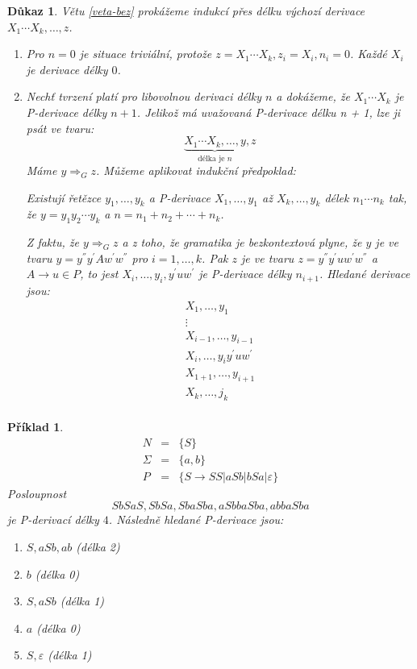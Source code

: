 \documentclass[10pt, a4paper, titlepage]{article}
\theoremstyle{note}
\newtheorem{dukaz}{Důkaz}
\newtheorem{priklad}{Příklad}
\begin{document}
\begin{dukaz}
Větu \ref{veta-bez} prokážeme indukcí přes délku výchozí derivace $X_{1} \cdots X_{k}, \ldots, z$.
\begin{enumerate}
\item
Pro $n = 0$ je situace triviální, protože $z = X_{1} \cdots X_{k}, z_{i} = X_{i}, n_{i} = 0$. Každé $X_{i}$ je derivace délky $0$.

\item
Nechť tvrzení platí pro libovolnou derivaci délky $n$ a dokážeme, že $X_{1} \cdots X_{k}$ je P-derivace délky $n + 1$.
Jelikož má uvažovaná P-derivace délku n + 1, lze ji psát ve tvaru:
$$
\underbrace {X_{1} \cdots X_{k}, \ldots, y}_{\text{délka je } n}, z
$$
Máme $y \Rightarrow_{G}z$. Můžeme aplikovat indukční předpoklad:

Existují řetězce $y_{1}, \ldots, y_{k}$ a P-derivace $X_{1}, \ldots, y_{1}$ až $X_{k}, \ldots, y_{k}$ 
délek $n_{1} \cdots n_{k}$ tak, že $y = y_{1} y_{2} \cdots y_{k}$ a $n = n_{1} + n_{2} + \cdots + n_{k}$. 

Z faktu, že $y  \Rightarrow_{G}z$ a z toho, že gramatika je bezkontextová plyne, že $y$ je ve tvaru 
$y = y^{''} y^{'} A w^{'} w^{''}$ pro $i = 1, \ldots, k$. Pak $z$ je ve tvaru $z = y^{''} y^{'} u w^{'} w^{''}$ a $A \rightarrow u \in P$,
to jest $X_{i}, \ldots, y_{i}, y^{'} u w^{'}$ je P-derivace délky $n_{i+1}$. Hledané derivace jsou:
\begin{gather*}
X_{1}, \ldots, y_{1} \\
\vdots \\
X_{i-1}, \ldots, y_{i-1} \\
X_{i}, \ldots, y_{i} y^{'} u w^{'} \\
X_{1+1}, \ldots, y_{i+1} \\
X_{k}, \ldots, j_{k} \\ %
\end{gather*}
\end{enumerate}
\end{dukaz}

\begin{priklad}
\begin{eqnarray*}
N &=& \lbrace S \rbrace \\
\Sigma &=& \lbrace a, b \rbrace \\
P &=& \lbrace S \rightarrow SS|aSb|bSa| \varepsilon \rbrace
\end{eqnarray*}
Posloupnost
$$
SbSaS, SbSa, SbaSba, aSbbaSba , abbaSba
$$
je P-derivací délky $4$.
Následně hledané P-derivace jsou:
\begin{enumerate}
\item
$S, aSb, ab$ (délka 2)
\item
$b$ (délka 0)
\item
$S, aSb$ (délka 1)
\item
$a$ (délka 0)
\item
$S, \varepsilon $ (délka 1)
\end{enumerate}
\end{priklad}
\end{document}
